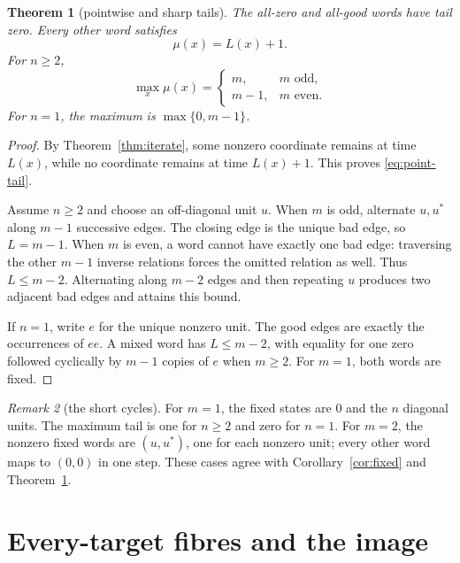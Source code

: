 \documentclass[a4paper,10pt]{amsart}
\newtheorem{theorem}{Theorem}[section]
\theoremstyle{remark}
\newtheorem{remark}[theorem]{Remark}
\begin{document}
\begin{theorem}[pointwise and sharp tails]\label{thm:tails}
The all-zero and all-good words have tail zero.  Every other word satisfies
\begin{equation}\label{eq:point-tail}
 \mu(x)=L(x)+1.
\end{equation}
For $n\geq2$,
\begin{equation}\label{eq:max-tail}
 \max_x\mu(x)=\begin{cases}m,&m\text{ odd},\\m-1,&m\text{ even}.
 \end{cases}
\end{equation}
For $n=1$, the maximum is $\max\{0,m-1\}$.
\end{theorem}

\begin{proof}
By Theorem~\ref{thm:iterate}, some nonzero coordinate remains at time $L(x)$,
while no coordinate remains at time $L(x)+1$.  This proves
\eqref{eq:point-tail}.

Assume $n\geq2$ and choose an off-diagonal unit $u$.  When $m$ is odd,
alternate $u,u^*$ along $m-1$ successive edges.  The closing edge is the
unique bad edge, so $L=m-1$.  When $m$ is even, a word cannot have exactly
one bad edge: traversing the other $m-1$ inverse relations forces the omitted
relation as well.  Thus $L\leq m-2$.  Alternating along $m-2$ edges and then
repeating $u$ produces two adjacent bad edges and attains this bound.

If $n=1$, write $e$ for the unique nonzero unit.  The good edges are exactly
the occurrences of $ee$.  A mixed word has $L\leq m-2$, with equality for
one zero followed cyclically by $m-1$ copies of $e$ when $m\geq2$.  For
$m=1$, both words are fixed.
\end{proof}

\begin{remark}[the short cycles]\label{rem:boundaries}
For $m=1$, the fixed states are $0$ and the $n$ diagonal units.  The maximum
tail is one for $n\geq2$ and zero for $n=1$.  For $m=2$, the nonzero fixed
words are $(u,u^*)$, one for each nonzero unit; every other word maps to
$(0,0)$ in one step.  These cases agree with
Corollary~\ref{cor:fixed} and Theorem~\ref{thm:tails}.
\end{remark}

\section{Every-target fibres and the image}
\end{document}
